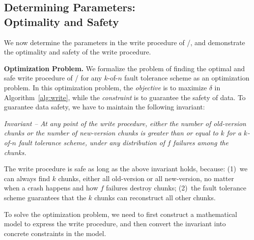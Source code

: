 
\vspace{-1em}
\subsection{Determining Parameters:\\Optimality and Safety}
\vspace{-0.5em}
\label{ssec:protocol-parameters}

We now determine the parameters in the write procedure of
\protocol/, and demonstrate the optimality and safety of the write procedure.


\noindent
\textbf{Optimization Problem.}
We formalize the problem of finding the optimal and safe write
procedure of \protocol/ for any $k$-of-$n$ fault tolerance scheme as an optimization problem. 
In this optimization problem, the \emph{objective} is
to maximize $\delta$ in Algorithm~\ref{alg:write}, while the \emph{constraint}
is to guarantee the safety of data. To guarantee data safety, we have to maintain
the following invariant:

\emph{Invariant -- At any point of the write procedure, \emph{either} the
number of old-version chunks \emph{or} the number of new-version chunks is
greater than or equal to $k$ for a $k$-of-$n$ fault tolerance scheme, under
\emph{any distribution} of $f$ failures among the chunks. }

The write procedure is safe as long as the above invariant holds, because:
(1)~we can always find $k$ chunks, either all old-version or all new-version,
no matter when a crash happens and how $f$ failures destroy chunks; (2)~the
fault tolerance scheme guarantees that the $k$ chunks can reconstruct all other
chunks.

To solve the optimization problem, we need to first construct a mathematical
model to express the write procedure, and then convert the invariant into
concrete constraints in the model.

